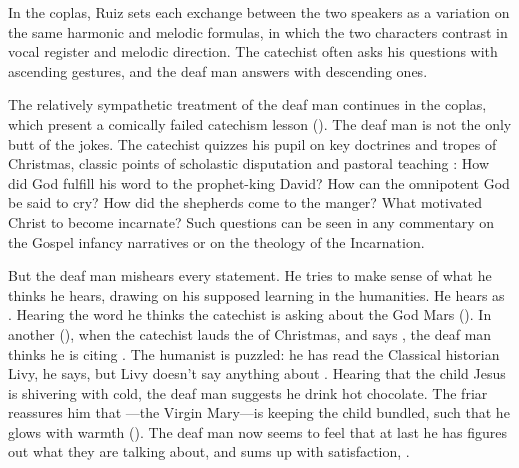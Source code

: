 In the coplas, Ruiz sets each exchange between the two speakers as a variation on the same harmonic and melodic formulas, in which the two characters contrast in vocal register and melodic direction.
The catechist often asks his questions with ascending gestures, and the deaf man answers with descending ones.


The relatively sympathetic treatment of the deaf man continues in the coplas, which present a comically failed catechism lesson ().
The deaf man is not the only butt of the jokes.
The catechist quizzes his pupil on key doctrines and tropes of Christmas, classic points of scholastic disputation and pastoral teaching :
How did God fulfill his word to the prophet-king David?
How can the omnipotent God be said to cry?
How did the shepherds come to the manger?
What motivated Christ to become incarnate?
Such questions can be seen in any commentary on the Gospel infancy narratives or on the theology of the Incarnation.

But the deaf man mishears every statement.
He tries to make sense of what he thinks he hears, drawing on his supposed learning in the humanities.
He hears  as .
Hearing the word  he thinks the catechist is asking about the God Mars ().
In another (), when the catechist lauds the  of Christmas, and says , the deaf man thinks he is citing .
The humanist is puzzled: he has read the Classical historian Livy, he says, but Livy doesn't say anything about .
Hearing that the child Jesus is shivering with cold, the deaf man suggests he drink hot chocolate.
The friar reassures him that ---the Virgin Mary---is keeping the child  bundled, such that he glows with warmth ().
The deaf man now seems to feel that at last he has figures out what they are talking about, and sums up with satisfaction, .

